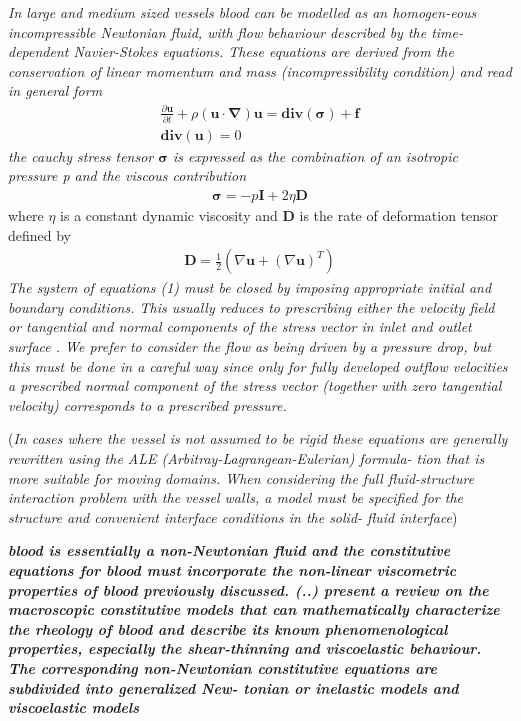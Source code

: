 \documentclass[11pt,letterpaper]{article}
\begin{document}
\textit{ In large and medium sized vessels blood can be modelled as an homogen-eous incompressible Newtonian fluid, with flow behaviour described by the
time-dependent Navier-Stokes equations. These equations are derived from
the conservation of linear momentum and mass (incompressibility condition) and read in general form}
\begin{align}
    \frac{\partial \bm{u}}{\partial t} + \rho (\bm{u} \cdot \bm{\nabla})\bm{u} = \bm{div}(\bm{\sigma}) + \bm{f} \\
    \bm{div}(\bm{u}) = 0
\end{align}
\textit{the cauchy stress tensor $\bm{\sigma}$ is expressed as the combination of an isotropic pressure p and the viscous contribution}
\begin{align}
    \bm{\sigma} = -p\bm{I} + 2\eta \bm{D}
\end{align}
where $\eta$ is a constant dynamic viscosity and $\bm{D}$ is the rate of deformation tensor defined by
\begin{align}
   \bm{D} = \frac{1}{2}(\nabla \bm{u} + (\nabla \bm{u})^T)
\end{align}
\textit{The system of equations (1) must be closed by imposing appropriate initial and boundary conditions. This usually reduces to prescribing either the velocity field or tangential and normal components of the stress vector in inlet and outlet surface . We prefer to consider the flow as being driven by a pressure drop, but this must be done in a careful way since only for fully developed outflow velocities a prescribed normal component of the stress vector (together with zero tangential velocity) corresponds to a prescribed pressure.}



(\textit{In cases where the vessel is not assumed to be rigid these equations are generally rewritten using the ALE (Arbitray-Lagrangean-Eulerian) formula- tion that is more suitable for moving domains. When considering the full fluid-structure interaction problem with the vessel walls, a model must be specified for the structure and convenient interface conditions in the solid- fluid interface})



\textit{\textbf{blood is essentially a non-Newtonian fluid and the constitutive equations for blood must incorporate the non-linear viscometric properties of blood previously discussed. (..) present a review on the macroscopic constitutive models that can mathematically characterize the rheology of blood and describe its known phenomenological properties, especially the shear-thinning and viscoelastic behaviour. The corresponding non-Newtonian constitutive equations are subdivided into generalized New- tonian or inelastic models and viscoelastic models}}
\end{document}
